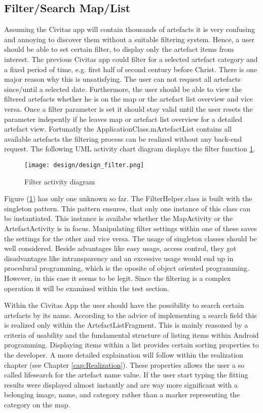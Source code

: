 \subsection{Filter/Search Map/List}
Assuming the Civitas app will contain thousands of artefacts it is very confusing and annoying to discover them without a suitable filtering system. Hence, a user should be able to set certain filter, to display only the artefact items from interest. The previous Civitas app could filter for a selected artefact category and a fixed period of time, e.g. first half of second century before Christ. There is one major reason why this is unsatisfying. The user can not request all artefacts since/until a selected date. Furthermore, the user should be able to view the filtered artefacts whether he is on the map or the artefact list overview and vice versa. Once a filter parameter is set it should stay valid until the user resets the parameter indepently if he leaves map or artefact list overview for a detailed artefact view. Fortunatly the ApplicationClass.mArtefactList contains all available artefacts the filtering process can be realized without any back-end request. The following UML activity chart diagram displays the filter function \ref{fig:design_filter}.

\begin{figure}[H]
	\centering \texttt{[image: design/design\_filter.png]}
	\caption{Filter activity diagram}	
	\label{fig:design_filter}
\end{figure}
Figure (\ref{fig:design_filter}) has only one unknown so far. The FilterHelper.class is built with the singleton pattern. This pattern ensures, that only one instance of this class can be instantiated. This instance is availabe whether the MapActivity or the ArtefactActivity is in focus. Manipulating filter settings within one of these saves the settings for the other and vice versa. The usage of singleton classes should be well considered. Beside advantages like easy usage, access control, they got disadvantages like intransparency and an excessive usage would end up in procedural programming, which is the oposite of object oriented programming. However, in this case it seems to be legit. Since the filtering is a complex operation it will be examined within the test section.
 
Within the Civitas App the user should have the possibility to search certain artefacts by its name. According to the advice of implementing a search field this is realized only within the ArtefactListFragment. This is mainly reasoned by a criteria of usability and the fundamental structure of listing items within Android programming. Displaying items within a list provides certain sorting properties to the developer. A more detailed explaination will follow within the realization chapter (see Chapter \ref{cap:Realization}). These properties allows the user a so called lifesearch for the artefact name value. If the user start typing the fitting results were displayed almost instantly and are way more significant with a belonging image, name, and category rather than a marker representing the category on the map.



